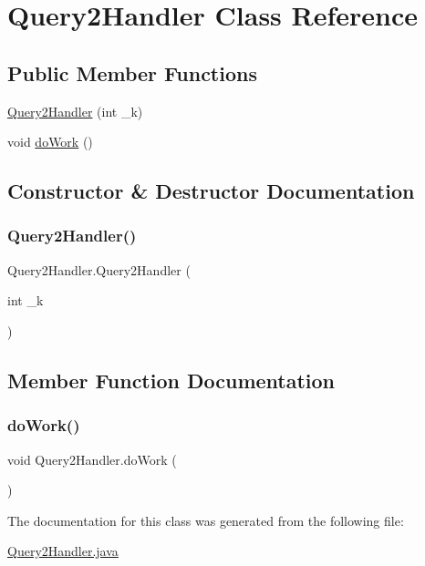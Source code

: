 \hypertarget{class_query2_handler}{}\section{Query2\+Handler Class Reference}
\label{class_query2_handler}
\subsection*{Public Member Functions}
\begin{DoxyCompactItemize}
\item 
\hyperlink{class_query2_handler_ac7924cedf070f4258238fa8cefa71818}{Query2\+Handler} (int \+\_\+k)
\item 
void \hyperlink{class_query2_handler_a29ff96d28d8af3b389f7a927aa88ef94}{do\+Work} ()
\end{DoxyCompactItemize}


\subsection{Constructor \& Destructor Documentation}
\hypertarget{class_query2_handler_ac7924cedf070f4258238fa8cefa71818}{}\label{class_query2_handler_ac7924cedf070f4258238fa8cefa71818} 
\subsubsection{\texorpdfstring{Query2\+Handler()}{Query2Handler()}}
{\footnotesize\ttfamily Query2\+Handler.\+Query2\+Handler (\begin{DoxyParamCaption}\item[{int}]{\+\_\+k }\end{DoxyParamCaption})}



\subsection{Member Function Documentation}
\hypertarget{class_query2_handler_a29ff96d28d8af3b389f7a927aa88ef94}{}\label{class_query2_handler_a29ff96d28d8af3b389f7a927aa88ef94} 
\subsubsection{\texorpdfstring{do\+Work()}{doWork()}}
{\footnotesize\ttfamily void Query2\+Handler.\+do\+Work (\begin{DoxyParamCaption}{ }\end{DoxyParamCaption})}



The documentation for this class was generated from the following file\+:\begin{DoxyCompactItemize}
\item 
\hyperlink{_query2_handler_8java}{Query2\+Handler.\+java}\end{DoxyCompactItemize}
